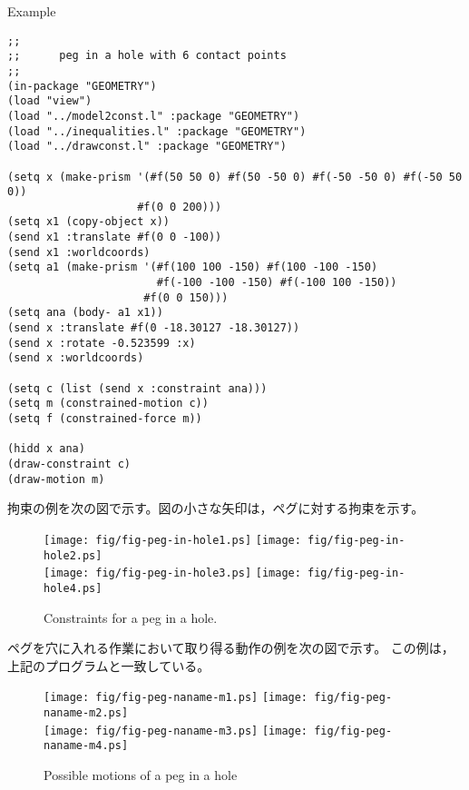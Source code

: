 Example\\
\begin{verbatim}
;;
;;      peg in a hole with 6 contact points
;;
(in-package "GEOMETRY")
(load "view")
(load "../model2const.l" :package "GEOMETRY")
(load "../inequalities.l" :package "GEOMETRY")
(load "../drawconst.l" :package "GEOMETRY")

(setq x (make-prism '(#f(50 50 0) #f(50 -50 0) #f(-50 -50 0) #f(-50 50 0))
                    #f(0 0 200)))
(setq x1 (copy-object x))
(send x1 :translate #f(0 0 -100))
(send x1 :worldcoords)
(setq a1 (make-prism '(#f(100 100 -150) #f(100 -100 -150)
                       #f(-100 -100 -150) #f(-100 100 -150))
                     #f(0 0 150)))
(setq ana (body- a1 x1))
(send x :translate #f(0 -18.30127 -18.30127))
(send x :rotate -0.523599 :x)
(send x :worldcoords)

(setq c (list (send x :constraint ana)))
(setq m (constrained-motion c))
(setq f (constrained-force m))

(hidd x ana)
(draw-constraint c)
(draw-motion m)
\end{verbatim}
\clearpage
拘束の例を次の図で示す。図の小さな矢印は，ペグに対する拘束を示す。
\\
\begin{figure}[h]
\texttt{[image: fig/fig-peg-in-hole1.ps]}
\texttt{[image: fig/fig-peg-in-hole2.ps]}\\
\texttt{[image: fig/fig-peg-in-hole3.ps]}
\texttt{[image: fig/fig-peg-in-hole4.ps]}
\caption{Constraints for a peg in a hole.}
\label{fig:peg-in-hole}
\end{figure}
\clearpage
ペグを穴に入れる作業において取り得る動作の例を次の図で示す。
この例は，上記のプログラムと一致している。
\begin{figure}[h]
\begin{center}
\texttt{[image: fig/fig-peg-naname-m1.ps]}
\texttt{[image: fig/fig-peg-naname-m2.ps]}\\
\texttt{[image: fig/fig-peg-naname-m3.ps]}
\texttt{[image: fig/fig-peg-naname-m4.ps]}
\end{center}
\caption{Possible motions of a peg in a hole}
\label{fig:peg-in-a-hole}
\end{figure}

\clearpage
